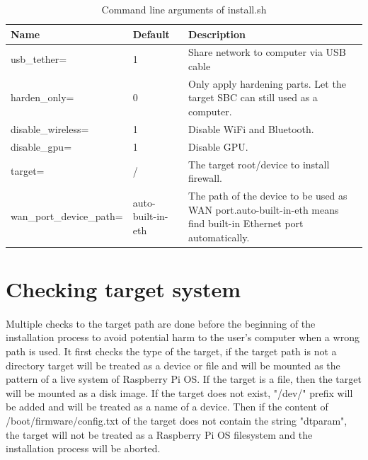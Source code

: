 \documentclass[mscthesis]{usiinfthesis}
\begin{document}
\begin{table}[H]
  \centering
  \begin{tabular}{|m{27mm}|m{30mm}|m{68mm}|}
    \hline
    Name                              & Default           & Description                                                                                                               \\
    \hline
    usb\_tether=                      & 1                 & Share network to computer via USB cable                                                                                   \\
    harden\_only=                     & 0                 & Only apply hardening parts. Let the target SBC can still used as a computer.                                              \\
    disable\_wireless=                & 1                 & Disable WiFi and Bluetooth.                                                                                               \\
    disable\_gpu=                     & 1                 & Disable GPU.                                                                                                              \\
    target=                           & /                 & The target root/device to install firewall.                                                                               \\
    wan\_port\_\newline device\_path= & auto-built-in-eth & The path of the device to be used as WAN port.\newline auto-built-in-eth means find built-in Ethernet port automatically. \\
    \hline
  \end{tabular}
  \caption{Command line arguments of install.sh}
  \label{tab:install_arg}
\end{table}

\section{Checking target system}
\paragraph{}
Multiple checks to the target path are done before the beginning of the installation process to avoid potential harm to the user's computer when a wrong path is used. It first checks the type of the target, if the target path is not a directory target will be treated as a device or file and will be mounted as the pattern of a live system of Raspberry Pi OS. If the target is a file, then the target will be mounted as a disk image. If the target does not exist, "/dev/" prefix will be added and will be treated as a name of a device. Then if the content of /boot/firmware/config.txt of the target does not contain the string "dtparam", the target will not be treated as a Raspberry Pi OS filesystem and the installation process will be aborted.
\end{document}
